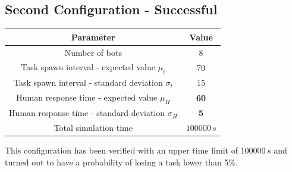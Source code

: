 \documentclass{article}
\begin{document}
		\subsection{Second Configuration - Successful}
			\label{sub:sim2}
			\begin{center}
				\begin{tabular}{ |c|c|}
					\hline
					Parameter & Value\\
					\hline
					\hline
					Number of bots & 8 \\
					\hline
					Task spawn interval - expected value $\mu_t$ & 70\\
					\hline					
					Task spawn interval - standard deviation $\sigma_t$ & 15\\
					\hline
					Human response time - expected value $\mu_H$ & \textbf{60}\footnotemark\\
					\hline					
					Human response time - standard deviation $\sigma_H$ & \textbf{5}\\
					\hline
					Total simulation time & $100000\,s$ \\
					\hline
				\end{tabular}
			\end{center}
			This configuration has been verified with an upper time limit of $100000\,s$ and turned out to have a probability of losing a task lower than 5\%.
			
\end{document}
